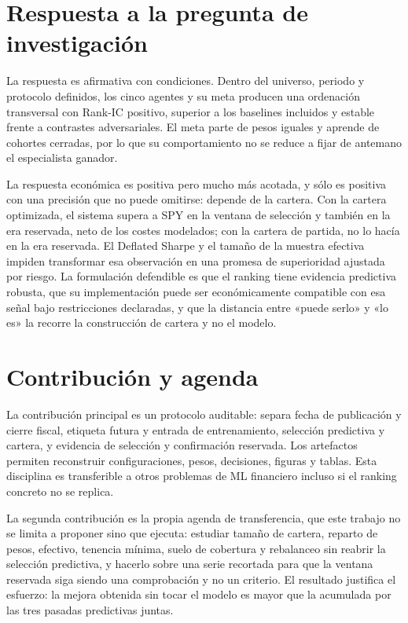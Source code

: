 \section{Respuesta a la pregunta de investigación}

La respuesta es afirmativa con condiciones. Dentro del universo, periodo y protocolo definidos, los
cinco agentes y su meta producen una ordenación transversal con Rank-IC positivo, superior a los
baselines incluidos y estable frente a contrastes adversariales. El meta parte de pesos iguales y
aprende de cohortes cerradas, por lo que su comportamiento no se reduce a fijar de antemano el
especialista ganador.

La respuesta económica es positiva pero mucho más acotada, y sólo es positiva con una precisión que
no puede omitirse: depende de la cartera. Con la cartera optimizada, el sistema supera a SPY en la
ventana de selección y también en la era reservada, neto de los costes modelados; con la cartera de
partida, no lo hacía en la era reservada. El Deflated Sharpe y el tamaño de la muestra efectiva
impiden transformar esa observación en una promesa de superioridad ajustada por riesgo. La
formulación defendible es que el ranking tiene evidencia predictiva robusta, que su implementación
puede ser económicamente compatible con esa señal bajo restricciones declaradas, y que la distancia
entre «puede serlo» y «lo es» la recorre la construcción de cartera y no el modelo.

\section{Contribución y agenda}

La contribución principal es un protocolo auditable: separa fecha de publicación y cierre fiscal,
etiqueta futura y entrada de entrenamiento, selección predictiva y cartera, y evidencia de selección
y confirmación reservada. Los artefactos permiten reconstruir configuraciones, pesos, decisiones,
figuras y tablas. Esta disciplina es transferible a otros problemas de ML financiero incluso si el
ranking concreto no se replica.

La segunda contribución es la propia agenda de transferencia, que este trabajo no se limita a
proponer sino que ejecuta: estudiar tamaño de cartera, reparto de pesos, efectivo, tenencia mínima,
suelo de cobertura y rebalanceo sin reabrir la selección predictiva, y hacerlo sobre una serie
recortada para que la ventana reservada siga siendo una comprobación y no un criterio. El resultado
justifica el esfuerzo: la mejora obtenida sin tocar el modelo es mayor que la acumulada por las tres
pasadas predictivas juntas.

